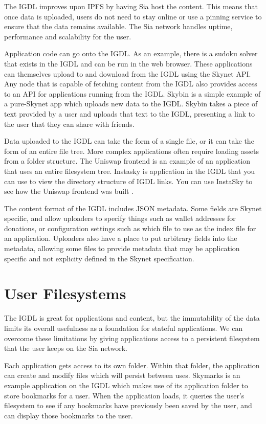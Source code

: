 \documentclass[twocolumn]{article}
\begin{document}
The IGDL improves upon IPFS by having Sia host the content. This means that once
data is uploaded, users do not need to stay online or use a pinning service to
ensure that the data remains available. The Sia network handles uptime,
performance and scalability for the user.

Application code can go onto the IGDL. As an example, there is a sudoku solver
\cite{c-sudoku} that exists in the IGDL and can be run in the web browser. These
applications can themselves upload to and download from the IGDL using the
Skynet API. Any node that is capable of fetching content from the IGDL also
provides access to an API for applications running from the IGDL. Skybin
\cite{c-skybin} is a simple example of a pure-Skynet app which uploads new data
to the IGDL. Skybin takes a piece of text provided by a user and uploads that
text to the IGDL, presenting a link to the user that they can share with
friends.

Data uploaded to the IGDL can take the form of a single file, or it can take the
form of an entire file tree. More complex applications often require loading
assets from a folder structure. The Uniswap frontend \cite{c-uniswap} is an
example of an application that uses an entire filesystem tree. Instasky
\cite{c-instasky} is application in the IGDL that you can use to view the
directory structure of IGDL links. You can use InstaSky to see how the Uniswap
frontend was built \cite{c-instasky-uniswap}.

The content format of the IGDL includes JSON metadata. Some fields are Skynet
specific, and allow uploaders to specify things such as wallet addresses for
donations, or configuration settings such as which file to use as the index file
for an application. Uploaders also have a place to put arbitrary fields into the
metadata, allowing some files to provide metadata that may be application
specific and not explicity defined in the Skynet specification.

\section{User Filesystems}
The IGDL is great for applications and content, but the immutability of the data
limits its overall usefulness as a foundation for stateful applications. We can
overcome these limitations by giving applications access to a persistent
filesystem that the user keeps on the Sia network.

Each application gets access to its own folder. Within that folder, the
application can create and modify files which will persist between uses.
Skymarks \cite{c-skymark} is an example application on the IGDL which makes use
of its application folder to store bookmarks for a user. When the application
loads, it queries the user's filesystem to see if any bookmarks have previously
been saved by the user, and can display those bookmarks to the user.
\end{document}
